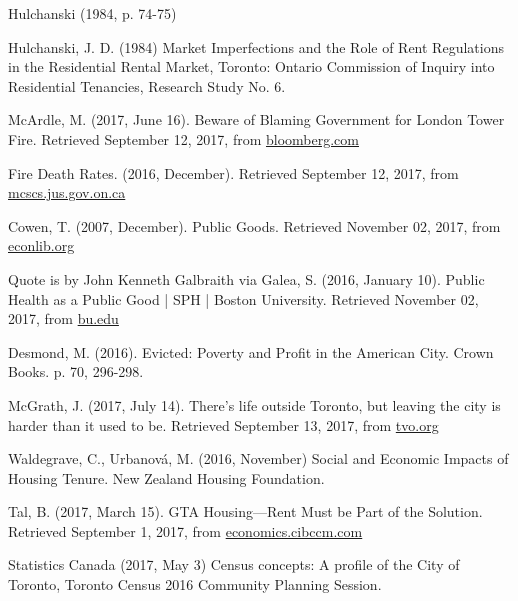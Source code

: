 \begin{thebibliography}{9}
   Hulchanski (1984, p. 74-75)

    Hulchanski, J. D. (1984) Market Imperfections and the Role of Rent Regulations in the Residential Rental Market, Toronto: Ontario Commission of Inquiry into Residential Tenancies, Research Study No. 6.

  McArdle, M. (2017, June 16). Beware of Blaming Government for London Tower Fire. Retrieved September 12, 2017, from \href{https://www.bloomberg.com/view/articles/2017-06-16/beware-of-blaming-government-for-london-tower-fire}{bloomberg.com}

  Fire Death Rates. (2016, December). Retrieved September 12, 2017, from \href{https://www.mcscs.jus.gov.on.ca/english/FireMarshal/MediaRelationsandResources/FireStatistics/OntarioFatalities/FireDeathRate/stats\_death\_rate.html}{mcscs.jus.gov.on.ca}

  Cowen, T. (2007, December). Public Goods. Retrieved November 02, 2017, from \href{http://www.econlib.org/library/Enc/PublicGoods.html}{econlib.org}

  Quote is by John Kenneth Galbraith via Galea, S. (2016, January 10). Public Health as a Public Good | SPH | Boston University. Retrieved November 02, 2017, from \href{https://www.bu.edu/sph/2016/01/10/public-health-as-a-public-good/}{bu.edu}

   Desmond, M. (2016). Evicted: Poverty and Profit in the American City. Crown Books. p. 70, 296-298.

  McGrath, J. (2017, July 14). There's life outside Toronto, but leaving the city is harder than it used to be. Retrieved September 13, 2017, from \href{http://tvo.org/article/current-affairs/the-next-ontario/theres-life-outside-toronto-but-leaving-the-city-is-harder-than-it-used-to-be}{tvo.org}

   Waldegrave, C., Urbanová, M. (2016, November) Social and Economic Impacts of Housing Tenure. New Zealand Housing Foundation.

  Tal, B. (2017, March 15). GTA Housing—Rent Must be Part of the Solution. Retrieved September 1, 2017, from \href{https://economics.cibccm.com/economicsweb/cds?ID=2475\&TYPE=EC\_PDF}{economics.cibccm.com}

  Statistics Canada (2017, May 3) Census concepts: A profile of the City of Toronto, Toronto Census 2016 Community Planning Session.


\end{thebibliography}
